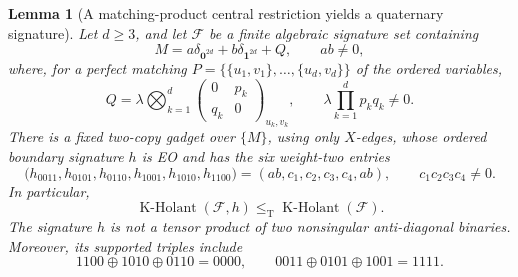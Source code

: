 \documentclass[11pt,letterpaper,onecolumn]{article}
\theoremstyle{plain}
\newtheorem{lemma}[lemma]{Lemma}
\theoremstyle{definition}
\theoremstyle{remark}
\newcommand{\cF}{\mathcal F}
\newcommand{\KHolant}{\operatorname{K\text{-}Holant}}
\newcommand{\one}{\mathbf 1}
\newcommand{\zero}{\mathbf 0}
\newcommand{\leT}{\leq_{\mathrm T}}
\begin{document}
	\begin{lemma}[A matching-product central restriction yields a quaternary signature]
		\label{lem:hc-transversal-cube-terminal}
		Let \(d\ge3\), and let \(\cF\) be a finite algebraic signature set
		containing
		\[
		M=a\delta_{\zero^{2d}}+b\delta_{\one^{2d}}+Q,
		\qquad ab\ne0,
		\]
		where, for a perfect matching
		\(P=\{\{u_1,v_1\},\ldots,\{u_d,v_d\}\}\) of the ordered variables,
		\[
		Q=\lambda\bigotimes_{k=1}^{d}
		\begin{pmatrix}0&p_k\\q_k&0\end{pmatrix}_{u_k,v_k},
		\qquad \lambda\prod_{k=1}^{d}p_kq_k\ne0.
		\]
		There is a fixed two-copy gadget over \(\{M\}\), using only \(X\)-edges, whose ordered boundary signature \(h\) is EO and has the six
		weight-two entries
		\begin{equation}
		\bigl(h_{0011},h_{0101},h_{0110},h_{1001},h_{1010},h_{1100}\bigr)
		=(ab,c_1,c_2,c_3,c_4,ab),
		\qquad c_1c_2c_3c_4\ne0.
		\label{eq:auto-wt-18a}
		\end{equation}
		In particular,
		\[
		\KHolant(\cF,h)\leT\KHolant(\cF).
		\]
		The signature \(h\) is not a tensor product of two nonsingular
		anti-diagonal binaries.  Moreover, its supported triples include
		\[
		1100\oplus1010\oplus0110=0000,
		\qquad
		0011\oplus0101\oplus1001=1111.
		\]
	\end{lemma}
	
\end{document}
